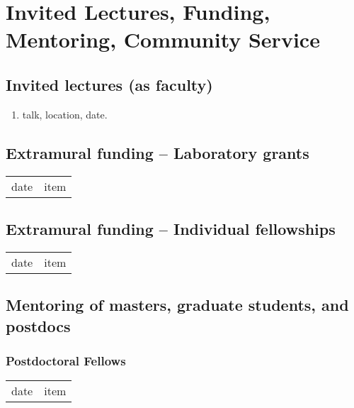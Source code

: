 \chapter{Invited Lectures, Funding, Mentoring, Community Service}
\label{CommunityService}

\vspace{-10mm}




\section{Invited lectures (as faculty)}

\begin{enumerate}

    \item talk, location, date.
 
\end{enumerate}

\section{Extramural funding – Laboratory grants}
\begin{tabular}[l]{ p{} p{} }
date & item\\
\end{tabular} 

\section{Extramural funding – Individual fellowships}
\begin{tabular}[l]{ p{} p{} }
date & item\\
\end{tabular} 

\section{Mentoring of masters, graduate students, and postdocs}

\subsection{Postdoctoral Fellows}
\begin{tabular}[l]{ p{} p{} }
date & item\\
\end{tabular} 

